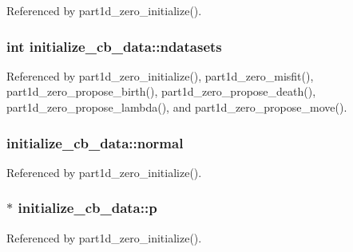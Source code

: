 Referenced by part1d\+\_\+zero\+\_\+initialize().

\subsubsection[{\texorpdfstring{ndatasets}{ndatasets}}]{\setlength{\rightskip}{0pt plus 5cm}int initialize\+\_\+cb\+\_\+data\+::ndatasets}\hypertarget{structinitialize__cb__data_ad1a2f4f225a9e540e4c34439f7a7496d}{}\label{structinitialize__cb__data_ad1a2f4f225a9e540e4c34439f7a7496d}


Referenced by part1d\+\_\+zero\+\_\+initialize(), part1d\+\_\+zero\+\_\+misfit(), part1d\+\_\+zero\+\_\+propose\+\_\+birth(), part1d\+\_\+zero\+\_\+propose\+\_\+death(), part1d\+\_\+zero\+\_\+propose\+\_\+lambda(), and part1d\+\_\+zero\+\_\+propose\+\_\+move().

\subsubsection[{\texorpdfstring{normal}{normal}}]{ initialize\+\_\+cb\+\_\+data\+::normal}\hypertarget{structinitialize__cb__data_a445e6f7516e6031fbc47d58592ae23cd}{}\label{structinitialize__cb__data_a445e6f7516e6031fbc47d58592ae23cd}


Referenced by part1d\+\_\+zero\+\_\+initialize().

\subsubsection[{\texorpdfstring{p}{p}}]{$\ast$ initialize\+\_\+cb\+\_\+data\+::p}\hypertarget{structinitialize__cb__data_ab7819725ce802ec4ac58f1636de92246}{}\label{structinitialize__cb__data_ab7819725ce802ec4ac58f1636de92246}


Referenced by part1d\+\_\+zero\+\_\+initialize().


